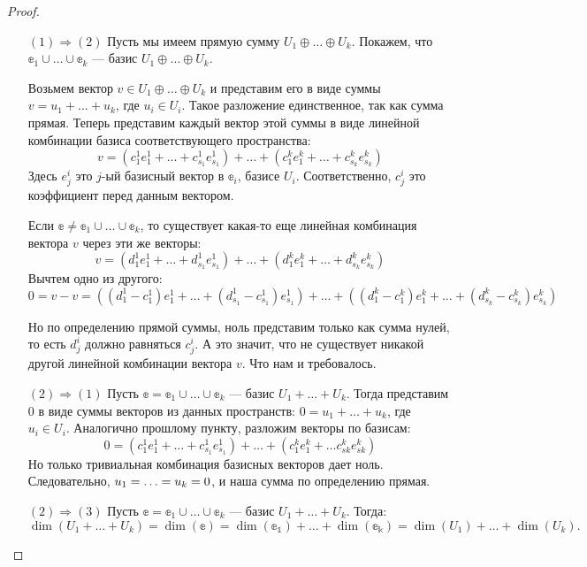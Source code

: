 \begin{proof}\ 
\begin{itemize}
	\item[$(1) \Rightarrow (2)$] Пусть мы имеем прямую сумму $U_1 \oplus \ldots \oplus U_k$. Покажем, что $\mathbb{e}_1 \cup \ldots \cup \mathbb{e}_k$ --- базис $U_1 \oplus \ldots \oplus U_k$.
	
	Возьмем вектор $v \in U_1 \oplus \ldots \oplus U_k$ и представим его в виде суммы $v = u_1 + \ldots + u_k$, где $u_i \in U_i$. Такое разложение единственное, так как сумма прямая. Теперь представим каждый вектор этой суммы в виде линейной комбинации базиса соответствующего пространства: 
	$$
	v  = (c^1_1e^1_1 + \ldots + c^1_{s_1}e^1_{s_1}) + \ldots + (c^k_1e^k_1 + \ldots + c^k_{s_k}e^k_{s_k})
	$$
	Здесь $e_j^i$ это $j$-ый базисный вектор в $\mathbb{e}_i$, базисе $U_i$. Соответственно, $c_j^i$ это коэффициент перед данным вектором. 
	
	Если $\mathbb{e} \neq \mathbb{e}_1 \cup \ldots \cup \mathbb{e}_k$, то существует какая-то еще линейная комбинация вектора $v$ через эти же векторы:
	$$
		v  = (d^1_1e^1_1 + \ldots + d^1_{s_1}e^1_{s_1}) + \ldots + (d^k_1e^k_1 + \ldots + d^k_{s_k}e^k_{s_k})
	$$
	Вычтем одно из другого:
	$$
	0 = v - v = ((d^1_1 - c^1_1)e^1_1 + \ldots + (d^1_{s_1} - c^1_{s_1})e^1_{s_1}) + \ldots + ((d^k_1 - c^k_1) e^k_1 + \ldots + (d^k_{s_k} - c^k_{s_k})e^k_{s_k})
	$$
	
	Но по определению прямой суммы, ноль представим только как сумма нулей, то есть $d^i_j$ должно равняться $c^i_j$. А это значит, что не существует никакой другой линейной комбинации вектора $v$. Что нам и требовалось.
	
	\item[$(2) \Rightarrow (1)$] Пусть $\mathbb{e} = \mathbb{e}_1 \cup \ldots \cup \mathbb{e}_k$ --- базис $U_1 + \ldots + U_k$. Тогда представим 0 в виде суммы векторов из данных пространств: $0 = u_1 + \ldots + u_k$, где $u_i \in U_i$. Аналогично прошлому пункту, разложим векторы по базисам:
	$$
	0 = (c^1_1e^1_1 + \ldots + c^1_{s_1}e^1_{s_1}) + \ldots + (c^k_1e^k_1 + \ldots c^k_{sk}e^k_{sk})
	$$
	Но только тривиальная комбинация базисных векторов дает ноль. Следовательно, $u_1 \hm= \ldots = u_k = 0$, и наша сумма по определению прямая.
	
	\item[$(2) \Rightarrow (3)$] Пусть $\mathbb{e} = \mathbb{e}_1 \cup \ldots \cup \mathbb{e}_k$ --- базис $U_1 + \ldots + U_k$. Тогда: 
	$$
	\dim(U_1 + \ldots + U_k)  = \dim(\mathbb{e}) = \dim(\mathbb{e_1})+ \ldots + \dim(\mathbb{e_k}) = \dim(U_1) + \ldots + \dim(U_k).
	$$
	

\end{itemize}
\end{proof}
